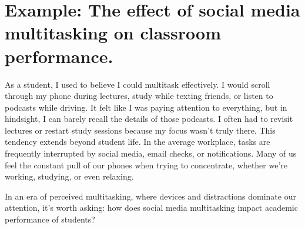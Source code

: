 \documentclass[
  letterpaper,
  DIV=11,
  numbers=noendperiod,
  oneside]{scrreprt}
\begin{document}
\section{Example: The effect of social media multitasking on classroom
performance.}\label{example-the-effect-of-social-media-multitasking-on-classroom-performance.}

As a student, I used to believe I could multitask effectively. I would
scroll through my phone during lectures, study while texting friends, or
listen to podcasts while driving. It felt like I was paying attention to
everything, but in hindsight, I can barely recall the details of those
podcasts. I often had to revisit lectures or restart study sessions
because my focus wasn't truly there. This tendency extends beyond
student life. In the average workplace, tasks are frequently interrupted
by social media, email checks, or notifications. Many of us feel the
constant pull of our phones when trying to concentrate, whether we're
working, studying, or even relaxing.

In an era of perceived multitasking, where devices and distractions
dominate our attention, it's worth asking: how does social media
multitasking impact academic performance of students?
\end{document}
